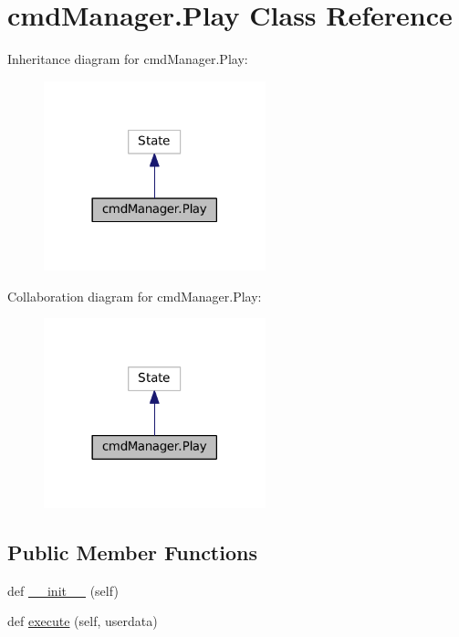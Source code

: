 \hypertarget{classcmdManager_1_1Play}{}\section{cmd\+Manager.\+Play Class Reference}
\label{classcmdManager_1_1Play}


Inheritance diagram for cmd\+Manager.\+Play\+:
\nopagebreak
\begin{figure}[H]
\begin{center}
\leavevmode
\includegraphics[width=182pt]{classcmdManager_1_1Play__inherit__graph}
\end{center}
\end{figure}


Collaboration diagram for cmd\+Manager.\+Play\+:
\nopagebreak
\begin{figure}[H]
\begin{center}
\leavevmode
\includegraphics[width=182pt]{classcmdManager_1_1Play__coll__graph}
\end{center}
\end{figure}
\subsection*{Public Member Functions}
\begin{DoxyCompactItemize}
\item 
def \hyperlink{classcmdManager_1_1Play_a4d2579c5fbfe43cfbeb085a149813ed3}{\+\_\+\+\_\+init\+\_\+\+\_\+} (self)
\item 
def \hyperlink{classcmdManager_1_1Play_a6e2839da28e556dc522779a43952eb1a}{execute} (self, userdata)
\end{DoxyCompactItemize}
